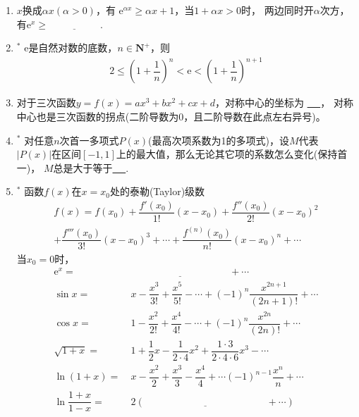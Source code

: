 \documentclass{article}
\newif\ifte
\newcommand{\e}{\mathrm{e}}
\renewcommand\leq\leqslant
\renewcommand\geq\geqslant
\begin{document}
\begin{multicols}{2}
\begin{enumerate}[leftmargin=20pt]
\item $ x $换成$ \alpha x (\alpha>0)$，有
$ \e^{\alpha x}\geq \alpha x+1 $，当$ 1+\alpha x>0 $时，
两边同时开$ \alpha $次方，有$ \e^x\geq \underline{\ \ifte
(1+\alpha x)^{\frac{1}{\alpha}} \else \hspace{2cm} \fi\ } $. 

\item $^*$ $ \e $是自然对数的底数，$ n\in \textbf{N}^+ $，则
\begin{gather*}
    2 \leq \left( 1+\dfrac{1}{n}\right)^{n} < \e < 
    \left( 1+\dfrac{1}{n}\right)^{n+1}
\end{gather*}

\item 对于三次函数$ y=f(x)=ax^3+bx^2+cx+d $，对称中心的坐标为
\underline{\ \ifte $ \left(-\dfrac{b}{3a},f\Big(-\dfrac{b}{3a}
    \Big)\right) $\else \hspace{2.5cm} \fi\ }，
对称中心也是三次函数的拐点(二阶导数为0，且二阶导数在此点左右异号)。

\item $^*$ 对任意$ n $次首一多项式$ P(x) $(最高次项系数为1的多项式)，设$ M $代表
$ |P(x)| $在区间$ [-1,1] $上的最大值，那么无论其它项的系数怎么变化(保持首一)，
$ M $总是大于等于\underline{\ \ifte $ \dfrac{1}{2^{n-1}} $
    \else \hspace{2cm} \fi\ }. 

\item $^*$ 函数$ f(x) $在$ x=x_0 $处的泰勒(Taylor)级数
\begin{gather*}
    f(x)=f(x_0)+\dfrac{f'(x_0)}{1!}(x-x_0)+\dfrac{f''(x_0)}{2!}
    (x-x_0)^2\\ + \dfrac{f'''(x_0)}{3!}(x-x_0)^3+\cdots+
    \dfrac{f^{(n)}(x_0)}{n!}(x-x_0)^n+\cdots
\end{gather*}
当$ x_0=0 $时，
\begin{align*}
    \e^x=&\ \underline{\ \ifte 1+x+\dfrac{x^2}{2!}+\cdots
        +\dfrac{x^n}{n!}\else \hspace{4cm} \fi\ }+\cdots \\
    \sin x=&\ x-\dfrac{x^3}{3!}+\dfrac{x^5}{5!}-\cdots +(-1)^n
    \dfrac{x^{2n+1}}{(2n+1)!} +\cdots \\
    \cos x=&\ 1-\dfrac{x^2}{2!}+\dfrac{x^4}{4!}-\cdots +(-1)^n
    \dfrac{x^{2n}}{(2n)!} +\cdots \\
    \sqrt{1+x}=&\ 1+\dfrac{1}{2}x-\dfrac{1}{2\cdot 4}x^2
    +\dfrac{1\cdot 3}{2\cdot 4\cdot 6}x^3-\cdots \\
    \ln(1+x)=&\ x-\dfrac{x^2}{2}+\dfrac{x^3}{3}-\dfrac{x^4}{4}+
    \cdots (-1)^{n-1}\dfrac{x^n}{n}+ \cdots \\
    \ln\dfrac{1+x}{1-x}=&\ 2\left(\underline{\ \ifte 
    x+\dfrac{x^3}{3}+\dfrac{x^5}{5}+\cdots +
    \dfrac{x^{2n-1}}{2n-1}\else \hspace{5cm} \fi\ } +\cdots \right)
\end{align*} 


\end{enumerate}
\end{multicols}
\end{document}
